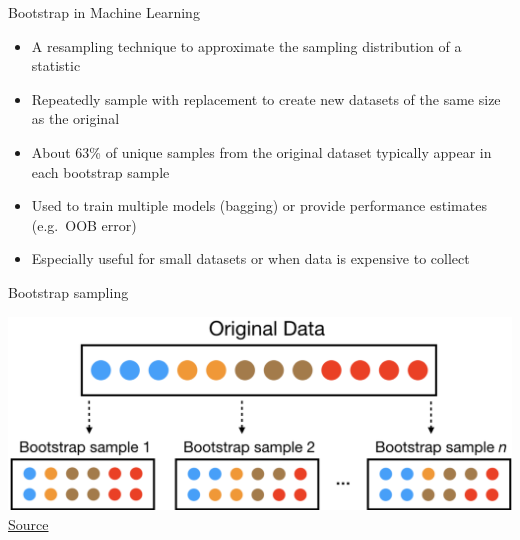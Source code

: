 \documentclass[aspectratio=169]{beamer}
\begin{document}

\begin{frame}{Bootstrap in Machine Learning}
\begin{itemize}
    \item A resampling technique to approximate the sampling distribution of a statistic
    \item Repeatedly sample with replacement to create new datasets of the same size as the original
    \item About 63\% of unique samples from the original dataset typically appear in each bootstrap sample
    \item Used to train multiple models (bagging) or provide performance estimates (e.g.\ OOB error)
    \item Especially useful for small datasets or when data is expensive to collect
\end{itemize}
\end{frame}

\begin{frame}{Bootstrap sampling}
	\begin{center}
		\includegraphics[width=1.0\textwidth]{figures/bootstrap_sampling.png}\\
		\href{https://datasciencedojo.com/blog/bootstrap-sampling/}{Source}
	\end{center}
\end{frame}
\end{document}
